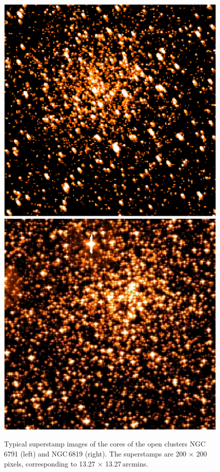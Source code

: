 \begin{figure}[htbp]
    \centering
    \includegraphics[width=0.45\linewidth]{Chapter1/ngc6791.jpg}
    \includegraphics[width=0.45\linewidth]{Chapter1/ngc6819.jpeg}
    \caption[Superstamps of NGC\,6791 and NGC\,6819]{Typical superstamp images of the cores of the open clusters NGC\,6791 (left) and NGC\,6819 (right). The superstamps are 200 $\times$ 200\,pixels, corresponding to 13.27 $\times$ 13.27\,arcmins.}
    \label{fig:SS}
\end{figure}



